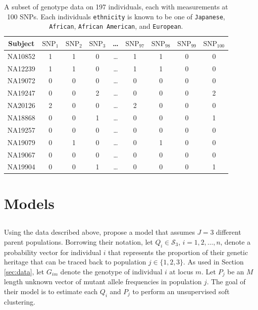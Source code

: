 \documentclass{article}
\begin{document}
\begin{table}[h]
\centering
\caption{A subset of genotype data on 197 individuals, each with measurements at 100 SNPs. Each individuals \texttt{ethnicity} is known to be one of \texttt{Japanese}, \texttt{African}, \texttt{African American}, and \texttt{European}.}
\label{tab:data_example}
\begin{tabular}{ccccccccc}
\hline
Subject & $\text{SNP}_1$ & $\text{SNP}_2$ & $\text{SNP}_3$ & \dots & $\text{SNP}_{97}$ & $\text{SNP}_{98}$ & $\text{SNP}_{99}$ & $\text{SNP}_{100}$ \\
\hline
NA10852 & 1 & 1 & 0 & \dots & 1 & 1 & 0 & 0 \\
NA12239 & 1 & 1 & 0 & \dots & 1 & 1 & 0 & 0 \\
NA19072 & 0 & 0 & 0 & \dots & 0 & 0 & 0 & 0 \\
NA19247 & 0 & 0 & 2 & \dots & 0 & 0 & 0 & 2 \\
NA20126 & 2 & 0 & 0 & \dots & 2 & 0 & 0 & 0 \\
NA18868 & 0 & 0 & 1 & \dots & 0 & 0 & 0 & 1 \\
NA19257 & 0 & 0 & 0 & \dots & 0 & 0 & 0 & 0 \\
NA19079 & 0 & 1 & 0 & \dots & 0 & 1 & 0 & 0 \\
NA19067 & 0 & 0 & 0 & \dots & 0 & 0 & 0 & 0 \\
NA19904 & 0 & 0 & 1 & \dots & 0 & 0 & 0 & 1
\end{tabular}
\end{table}

\section{Models}\label{sec:models}

\subsection{\citeauthor{efron2016CASI}}

Using the data described above, \cite{efron2016CASI} propose a model that assumes $J=3$ different parent populations. Borrowing their notation, let $Q_i \in \mathcal{S}_3$, $i = 1, 2, \dots, n$, denote a probability vector for individual $i$ that represents the proportion of their genetic heritage that can be traced back to population $j \in \{1, 2, 3\}$. As used in Section \ref{sec:data}, let $G_{im}$ denote the genotype of individual $i$ at locus $m$. Let $P_j$ be an $M$ length unknown vector of mutant allele frequencies in population $j$. The goal of their model is to estimate each $Q_i$ and $P_j$ to perform an unsupervised soft clustering.
\end{document}
